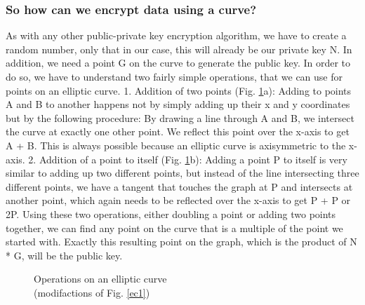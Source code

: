 \subsubsection{So how can we encrypt data using a curve?}
As with any other public-private key encryption algorithm, we have to create a random number, only that in our case, this will already be our private key N. In addition, we need a point G on the curve to generate the public key. In order to do so, we have to understand two fairly simple operations, that we can use for points on an elliptic curve.
1. Addition of two points (Fig. \ref{ec2}a): Adding to points A and B to another happens not by simply adding up their x and y coordinates but by the following procedure: By drawing a line through A and B, we intersect the curve at exactly one other point. We reflect this point over the x-axis to get A + B. This is always possible because an elliptic curve is axisymmetric to the x-axis.
2. Addition of a point to itself (Fig. \ref{ec2}b): Adding a point P to itself is very similar to adding up two different points, but instead of the line intersecting three different points, we have a tangent that touches the graph at P and intersects at another point, which again needs to be reflected over the x-axis to get P + P or 2P.
Using these two operations, either doubling a point or adding two points together, we can find any point on the curve that is a multiple of the point we started with. Exactly this resulting point on the graph, which is the product of N * G, will be the public key.

\begin{figure}%
    \centering
    \qquad
\caption{Operations on an elliptic curve \\ (modifactions of Fig. \ref{ec1})}%
\label{ec2}
\end{figure}

